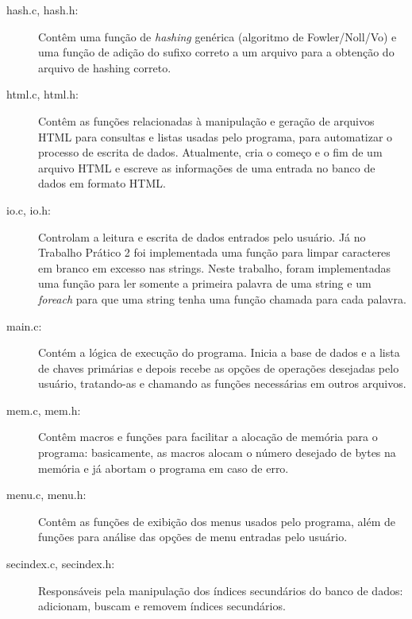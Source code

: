 \documentclass[a4paper,10pt]{article}
\begin{document}
\begin{description}
\item[hash.c, hash.h:] Contêm uma função de \textit{hashing} genérica (algoritmo de Fowler/Noll/Vo) e uma função de adição do sufixo correto a um arquivo para a obtenção do arquivo de hashing correto.

\item[html.c, html.h:] Contêm as funções relacionadas à manipulação e geração de arquivos HTML para consultas e listas usadas pelo programa, para automatizar o processo de escrita de dados. Atualmente, cria o começo e o fim de um arquivo HTML e escreve as informações de uma entrada no banco de dados em formato HTML.

 \item[io.c, io.h:] Controlam a leitura e escrita de dados entrados pelo usuário. Já no Trabalho Prático 2 foi implementada uma função para limpar caracteres em branco em excesso nas strings. Neste trabalho, foram implementadas uma função para ler somente a primeira palavra de uma string e um \textit{foreach} para que uma string tenha uma função chamada para cada palavra.

 \item[main.c:] Contém a lógica de execução do programa. Inicia a base de dados e a lista de chaves primárias e depois recebe as opções de operações desejadas pelo usuário, tratando-as e chamando as funções necessárias em outros arquivos.

 \item[mem.c, mem.h:] Contêm macros e funções para facilitar a alocação de memória para o programa: basicamente, as macros alocam o número desejado de bytes na memória e já abortam o programa em caso de erro.
	
 \item[menu.c, menu.h:] Contêm as funções de exibição dos menus usados pelo programa, além de funções para análise das opções de menu entradas pelo usuário.

 \item[secindex.c, secindex.h:] Responsáveis pela manipulação dos índices secundários do banco de dados: adicionam, buscam e removem índices secundários.
\end{description}
\end{document}
